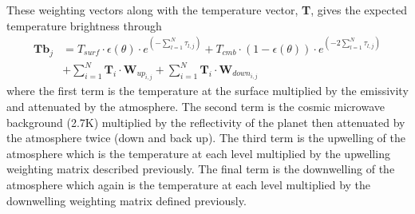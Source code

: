 These weighting vectors along with the temperature vector, \textbf{T}, gives the expected temperature brightness through
\begin{equation}
\begin{split}
\textbf{Tb}_j 	& = T_{surf}\cdot \epsilon(\theta)\cdot e^{\left(-\sum_{l=1}^{N} \tau_{l,j}\right)} + T_{cmb}\cdot (1-\epsilon(\theta))\cdot e^{\left(-2\sum_{l=1}^{N} \tau_{l,j}\right)} \\
				& + \sum_{i=1}^N \textbf{T}_i \cdot \textbf{W}_{up_{i,j}} + \sum_{i=1}^N \textbf{T}_i \cdot \textbf{W}_{down_{i,j}}
\end{split}
\end{equation}
where the first term is the temperature at the surface multiplied by the emissivity and attenuated by the atmosphere. The second term is the cosmic microwave background (2.7K) multiplied by the reflectivity of the planet then attenuated by the atmosphere twice (down and back up). The third term is the upwelling of the atmosphere which is the temperature at each level multiplied by the upwelling weighting matrix described previously. The final term is the downwelling of the atmosphere which again is the temperature at each level multiplied by the downwelling weighting matrix defined previously. 
